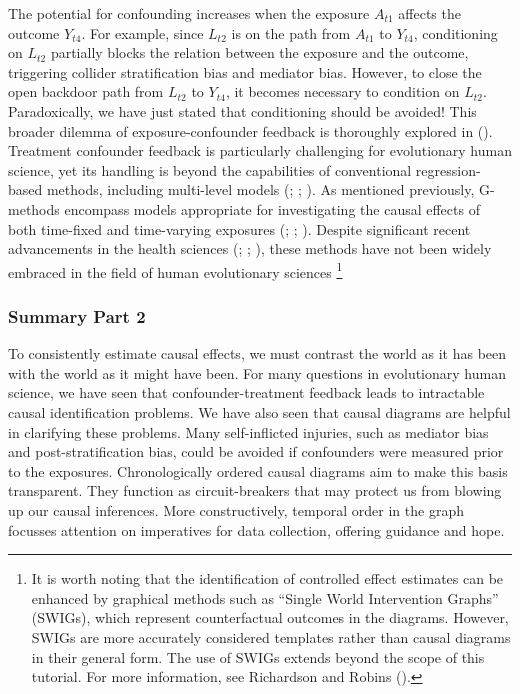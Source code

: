 \documentclass[
  singlecolumn]{article}
\begin{document}
The potential for confounding increases when the exposure \(A_{t1}\)
affects the outcome \(Y_{t4}\). For example, since \(L_{t2}\) is on the
path from \(A_{t1}\) to \(Y_{t4}\), conditioning on \(L_{t2}\) partially
blocks the relation between the exposure and the outcome, triggering
collider stratification bias and mediator bias. However, to close the
open backdoor path from \(L_{t2}\) to \(Y_{t4}\), it becomes necessary
to condition on \(L_{t2}\). Paradoxically, we have just stated that
conditioning should be avoided! This broader dilemma of
exposure-confounder feedback is thoroughly explored in
(). Treatment
confounder feedback is particularly challenging for evolutionary human
science, yet its handling is beyond the capabilities of conventional
regression-based methods, including multi-level models
(;
; ). As mentioned previously, G-methods encompass
models appropriate for investigating the causal effects of both
time-fixed and time-varying exposures
(;
;
). Despite significant
recent advancements in the health sciences
(;
;
), these methods have
not been widely embraced in the field of human evolutionary sciences
\footnote{It is worth noting that the identification of controlled
  effect estimates can be enhanced by graphical methods such as ``Single
  World Intervention Graphs'' (SWIGs), which represent counterfactual
  outcomes in the diagrams. However, SWIGs are more accurately
  considered templates rather than causal diagrams in their general
  form. The use of SWIGs extends beyond the scope of this tutorial. For
  more information, see Richardson and Robins
  ().}

\subsubsection{Summary Part 2}\label{summary-part-2}

To consistently estimate causal effects, we must contrast the world as
it has been with the world as it might have been. For many questions in
evolutionary human science, we have seen that confounder-treatment
feedback leads to intractable causal identification problems. We have
also seen that causal diagrams are helpful in clarifying these problems.
Many self-inflicted injuries, such as mediator bias and
post-stratification bias, could be avoided if confounders were measured
prior to the exposures. Chronologically ordered causal diagrams aim to
make this basis transparent. They function as circuit-breakers that may
protect us from blowing up our causal inferences. More constructively,
temporal order in the graph focusses attention on imperatives for data
collection, offering guidance and hope.
\end{document}
